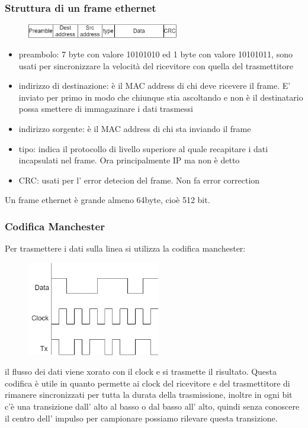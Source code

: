 \subsubsection{Struttura di un frame ethernet}
\begin{figure}[H]
    \centering
    \includegraphics[width=250px]{images/3_Reti_connessione_diretta/ethernet_frame.png}
\end{figure}
\begin{itemize}
    \item preambolo: 7 byte con valore 10101010 ed 1 byte con valore 10101011, sono usati per sincronizzare la velocità del ricevitore con quella del trasmettitore
    
    \item indirizzo di destinazione: è il MAC address di chi deve ricevere il frame.
    E' inviato per primo in modo che chiunque stia ascoltando e non è il destinatario possa smettere di immagazinare i dati trasmessi
    
    \item indirizzo sorgente: è il MAC address di chi sta inviando il frame
    
    \item tipo: indica il protocollo di livello superiore al quale recapitare i dati incapsulati nel frame.
    Ora principalmente IP ma non è detto
    
    \item CRC: usati per l' error detecion del frame.
    Non fa error correction
\end{itemize}
Un frame ethernet è grande almeno 64byte, cioè 512 bit.

\subsubsection{Codifica Manchester}
Per trasmettere i dati sulla linea si utilizza la codifica manchester:
\begin{figure}[H]
    \centering
    \includegraphics[width=220px]{images/3_Reti_connessione_diretta/manchester_encoding.png}
\end{figure}
il flusso dei dati viene xorato con il clock e si trasmette il risultato.
Questa codifica è utile in quanto permette ai clock del ricevitore e del trasmettitore di rimanere sincronizzati per tutta la durata della trasmissione, inoltre in ogni bit c'è una transizione dall' alto al basso o dal basso all' alto, quindi senza conoscere il centro dell' impulso per campionare possiamo rilevare questa transizione.

